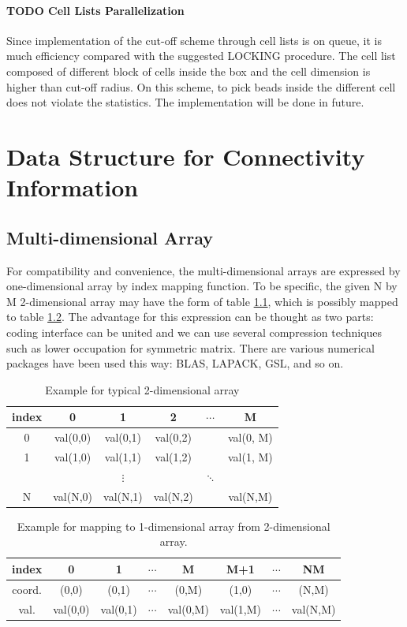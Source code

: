 \documentclass[10pt, a4paper]{article}
\begin{document}
\begin{appendices}
  \subsubsection{TODO Cell Lists Parallelization}
  Since implementation of the cut-off scheme through cell lists is on queue, it is much efficiency compared with the suggested LOCKING procedure. The cell list composed of different block of cells inside the box and the cell dimension is higher than cut-off radius. On this scheme, to pick beads inside the different cell does not violate the statistics. The implementation will be done in future.
\chapter{Data Structure for Connectivity Information}
\section{Multi-dimensional Array}
\label{sec:orgheadline2}
For compatibility and convenience, the multi-dimensional arrays are expressed by one-dimensional array by index mapping function. To be specific, the given N by M 2-dimensional array may have the form of table \ref{tab:orgtable1}, which is possibly mapped to table \ref{tab:orgtable2}. The advantage for this expression can be thought as two parts: coding interface can be united and we can use several compression techniques such as lower occupation for symmetric matrix. There are various numerical packages have been used this way: BLAS, LAPACK, GSL, and so on.


\begin{table}[htb]
\caption{\label{tab:orgtable1}
Example for typical 2-dimensional array}
\centering
\begin{tabular}{cccccc}
index & 0 & 1 & 2 & \(\cdots\) & M\\
\hline
0 & val(0,0) & val(0,1) & val(0,2) &  & val(0, M)\\
1 & val(1,0) & val(1,1) & val(1,2) &  & val(1, M)\\
 &  & \(\vdots\) &  & \(\ddots\) & \\
N & val(N,0) & val(N,1) & val(N,2) &  & val(N,M)\\
\end{tabular}
\end{table}

\begin{table}[htb]
\caption{\label{tab:orgtable2}
Example for mapping to 1-dimensional array from 2-dimensional array.}
\centering
\begin{tabular}{cccccccc}
index & 0 & 1 & \(\cdots\) & M & M+1 & \(\cdots\) & NM\\
\hline
coord. & (0,0) & (0,1) & \(\cdots\) & (0,M) & (1,0) & \(\cdots\) & (N,M)\\
\hline
val. & val(0,0) & val(0,1) & \(\cdots\) & val(0,M) & val(1,M) & \(\cdots\) & val(N,M)\\
\end{tabular}
\end{table}




\end{appendices}
\end{document}

